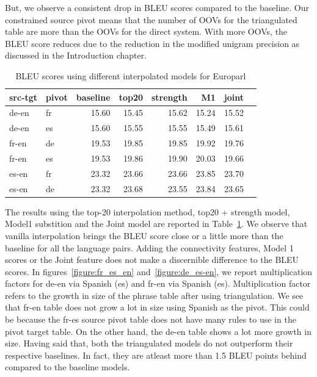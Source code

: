 	But, we observe a consistent drop in BLEU scores compared to the baseline. Our constrained source pivot means that the number of OOVs for the triangulated table are more than the OOVs for the direct system. With more OOVs, the BLEU score reduces due to the reduction in the modified unigram precision as discussed in the Introduction chapter.  
	\begin{table}
	\begin{tabular}{llrrrrrr}
	\toprule
	src-tgt & pivot & baseline & top20 & strength & M1 & joint  \\
	\toprule
	de-en & fr & 15.60 & 15.45 & 15.62 & 15.24 & 15.52 \\
	de-en & es & 15.60 & 15.55 & 15.55 & 15.49 & 15.61  \\
	fr-en & de & 19.53 & 19.85 & 19.85 & 19.92 & 19.76  \\
	fr-en & es & 19.53 & 19.86 & 19.90 & 20.03 & 19.66  \\
	es-en & fr & 23.32 & 23.66 & 23.66 & 23.85 & 23.70  \\
	es-en & de & 23.32 & 23.68 & 23.55 & 23.84 & 23.65  \\
	\bottomrule
	\end{tabular}
	\centering
	\small
	\caption{BLEU scores using different interpolated models for Europarl}
	\label{table:eparlintertopn}
	\end{table}

	The results using the top-20 interpolation method, top20 + strength model, Model1 substition and the Joint model are reported in Table~\ref{table:eparlintertopn}. We observe that vanilla interpolation brings the BLEU score close or a little more than the baseline for all the language pairs. Adding the connectivity features, Model 1 scores or the Joint feature does not make a discernible difference to the BLEU scores. In figures~\ref{figure:fr_es_en} and~\ref{figure:de_es-en}, we report multiplication factors for de-en via Spanish (es) and fr-en via Spanish (es). Multiplication factor refers to the growth in size of the phrase table after using triangulation. We see that fr-en table does not grow a lot in size using Spanish as the pivot. This could be because the fr-es source pivot table does not have many rules to use in the pivot target table. On the other hand, the de-en table shows a lot more growth in size. Having said that, both the triangulated models do not outperform their respective baselines. In fact, they are atleast more than 1.5 BLEU points behind compared to the baseline models. 
 
